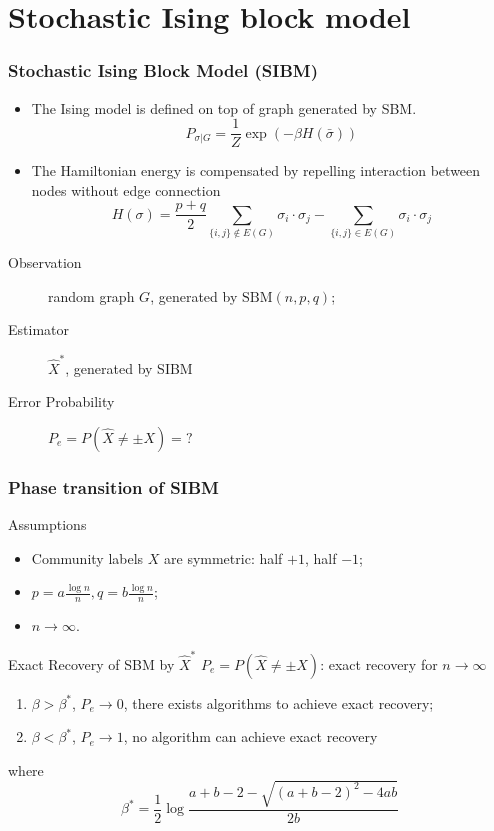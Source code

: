 \documentclass[notheorems]{beamer}
\begin{document}
	\section{Stochastic Ising block model}
	\frame{\tableofcontents[currentsection]}
	\begin{frame}
	\frametitle{Stochastic Ising Block Model (SIBM)}
	\begin{itemize}
	\item The Ising model is defined on top of graph generated by SBM.
	\begin{equation*}
	P_{\sigma | G} = \frac{1}{Z} \exp(-\beta H(\bar{\sigma}))
	\end{equation*}
	\item The Hamiltonian energy is compensated by repelling interaction between nodes without edge connection
	\begin{equation*}
	H(\sigma) = \frac{p+q}{2}\sum_{\{i,j\} \not\in E(G)} \sigma_i \cdot \sigma_j - \sum_{\{i,j\} \in E(G)} \sigma_i \cdot \sigma_j
	\end{equation*}
	\end{itemize}
	\begin{description}
		\item[Observation] random graph $G$, generated by $\textrm{SBM}(n,p,q)$;
		\item[Estimator] $\hat{X}^*$, generated by SIBM
		\item[Error Probability] $P_e=P(\hat{X} \neq \pm X) = ?$
	\end{description}
	\end{frame}
	
	\begin{frame}
	\frametitle{Phase transition of SIBM}
	\begin{block}{Assumptions}
		\begin{itemize}
			\item Community labels $X$ are symmetric: half $+1$, half $-1$;
			\item $p = a\frac{ \log n}{n}, q = b \frac{ \log n}{n}$;
			\item $n \to \infty$.
		\end{itemize}
	\end{block}
	\begin{block}{Exact Recovery of SBM by $\hat{X}^*$}
		$P_e=P(\hat{X} \neq \pm X)$: exact recovery for $n \to \infty$
	\begin{enumerate}
		\item $\beta > \beta^*$, $P_e \to 0$, there exists algorithms to achieve exact recovery;
		\item $\beta < \beta^*$, $P_e \to 1$, no algorithm can achieve exact recovery
	\end{enumerate}
	where
	\begin{equation*}
	\beta^* = \frac{1}{2} \log \frac{a+b-2 - \sqrt{(a+b-2)^2-4ab}}{2b}
	\end{equation*}
	\end{block}
	
	\end{frame}
	
\end{document}
